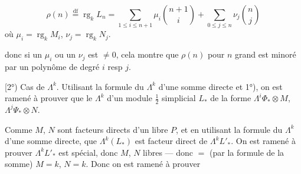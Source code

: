 \[
\rho(n)\overset{\mathrm{df}}=\operatorname{rg}_kL_n
=\sum_{1\leq i\leq n+1}\mu_i\binom{n+1}{i}
+\sum_{0\leq j\leq n}\nu_j\binom{n}{j}
\]
où $\mu_i=\operatorname{rg}_kM_i$, $\nu_j=\operatorname{rg}_kN_j$.

donc si  un $\mu_i$ ou un $\nu_j$
est $\neq0$, cela montre que $\rho(n)$ pour
$n$ grand est minoré par un polynôme
de degré $i$ resp $j$.

[2°) Cas de $\Lambda^k$. Utilisant la formule
du $\Lambda^k$ d'une somme directe et
1°), on est ramené à prouver que
le $\Lambda^k$ d'un module $\frac12$ simplicial
$L_*$ de la forme $\Lambda^i\Phi_*\otimes M$, $\Lambda^j\Psi_*\otimes N$.

Comme $M$, $N$ sont facteurs directs d'un
libre $P$, 
 
et en utilisant la
formule du $\Lambda^k$ d'une somme directe,
 que $\Lambda^k(L_*)$ est facteur
direct de $\Lambda^kL'_*$. On est ramené à
prouver $\Lambda^kL'_*$ est  spécial, donc
 $M$, $N$ libres --- donc $=$ (par la
formule de la somme) $M=k$, $N=k$.
Donc on est ramené à prouver
